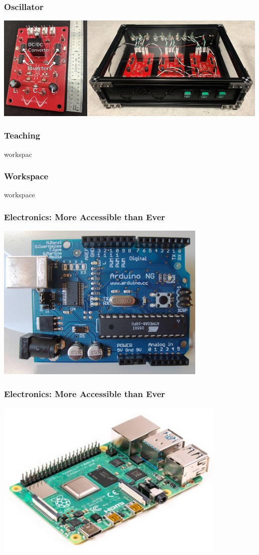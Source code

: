 \documentclass{presentation}
\begin{document}
\begin{frame}\frametitle{Oscillator}
  \includegraphics[width=\textwidth]{"./oscillator-pic.jpeg"}
\end{frame}

\begin{frame}\frametitle{Teaching}
  workspac
\end{frame}

\begin{frame}\frametitle{Workspace}
  workspace
\end{frame}

\begin{frame}\frametitle{Electronics: More Accessible than Ever}
  \centering
  \includegraphics[height=3in]{"./Arduino_top-1.jpg"}
\end{frame}

\begin{frame}\frametitle{Electronics: More Accessible than Ever}
  \centering
  \includegraphics[height=3in]{"./Raspberry_Pi_4_B.png"}
\end{frame}
\end{document}

